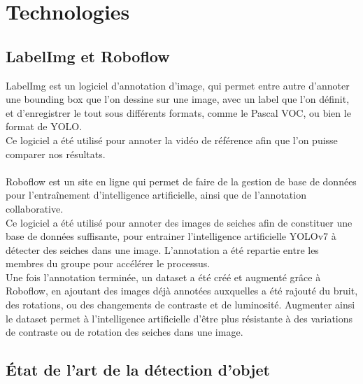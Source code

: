 \pagestyle{plain}
\chapter{Technologies}

\section{LabelImg et Roboflow}
LabelImg est un logiciel d'annotation d'image, qui permet entre autre d'annoter une bounding box que l'on dessine sur une image, avec un label que l'on définit, et d'enregistrer le tout sous différents formats, comme le Pascal VOC, ou bien le format de YOLO.\\
Ce logiciel a été utilisé pour annoter la vidéo de référence afin que l'on puisse comparer nos résultats.\\
\\
Roboflow est un site en ligne qui permet de faire de la gestion de base de données pour l'entraînement d'intelligence artificielle, ainsi que de l'annotation collaborative.\\
Ce logiciel a été utilisé pour annoter des images de seiches afin de constituer une base de données suffisante, pour entrainer l'intelligence artificielle YOLOv7\cite{wang_yolov7_nodate} à détecter des seiches dans une image. L'annotation a été repartie entre les membres du groupe pour accélérer le processus.\\
Une fois l'annotation terminée, un dataset a été créé et augmenté grâce à Roboflow, en ajoutant des images déjà annotées auxquelles a été rajouté du bruit, des rotations, ou des changements de contraste et de luminosité. Augmenter ainsi le dataset permet à l'intelligence artificielle d'être plus résistante à des variations de contraste ou de rotation des seiches dans une image.\\




\section{État de l'art de la détection d'objet}

